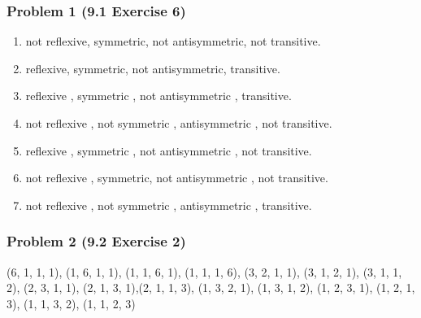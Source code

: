 \documentclass[12pt,hyperref={bookmarks=false}]{beamer}
\begin{document}
	\begin{frame}
	\frametitle{Problem 1 (9.1 Exercise 6)}
	\fontsize{10}{10pt}\selectfont
	\begin{enumerate}[label=(\alph*)]
	\setlength\itemsep{0em}
	\item not reflexive, symmetric, not antisymmetric, not transitive.
	\item reflexive, symmetric, not antisymmetric, transitive.	
	\item reflexive , symmetric , not antisymmetric , transitive.
	\item not reflexive , not symmetric , antisymmetric , not transitive.
	\item reflexive , symmetric , not antisymmetric , not transitive.
	\item not reflexive , symmetric, not antisymmetric , not transitive.
	\item not reflexive , not symmetric , antisymmetric , transitive.

	\end{enumerate}
	\end{frame}	%
	\begin{frame}
	\frametitle{Problem 2 (9.2 Exercise 2)}
	\fontsize{10}{10pt}\selectfont
	(6, 1, 1, 1), (1, 6, 1, 1), (1, 1, 6, 1), (1, 1, 1, 6), (3, 2, 1, 1), (3, 1, 2, 1), (3, 1, 1, 2), (2, 3, 1, 1), (2, 1, 3, 1),(2, 1, 1, 3), (1, 3, 2, 1), (1, 3, 1, 2), (1, 2, 3, 1), (1, 2, 1, 3), (1, 1, 3, 2), (1, 1, 2, 3)\\
	\end{frame}
	
\end{document}
